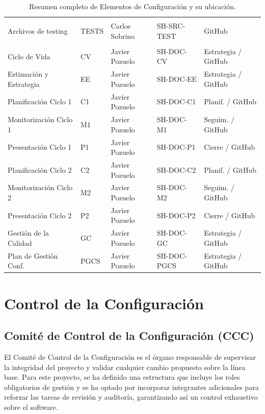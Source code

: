 \documentclass[11pt,a4paper]{article}
\begin{document}
\begin{table}[H]
\begin{tabularx}{\textwidth}{@{}l l l l L@{}}
\midrule
{}  \\
Archivos de testing & TESTS & Carlos Sobrino & SH-SRC-TEST & GitHub \\
\midrule
{}  \\
Ciclo de Vida & CV & Javier Pozuelo & SH-DOC-CV & Estrategia / GitHub \\
Estimación y Estrategia & EE & Javier Pozuelo & SH-DOC-EE & Estrategia / GitHub \\
Planificación Ciclo 1 & C1 & Javier Pozuelo & SH-DOC-C1 & Planif. / GitHub \\
Monitorización Ciclo 1 & M1 & Javier Pozuelo & SH-DOC-M1 & Seguim. / GitHub \\
Presentación Ciclo 1 & P1 & Javier Pozuelo & SH-DOC-P1 & Cierre / GitHub \\
Planificación Ciclo 2 & C2 & Javier Pozuelo & SH-DOC-C2 & Planif. / GitHub \\
Monitorización Ciclo 2 & M2 & Javier Pozuelo & SH-DOC-M2 & Seguim. / GitHub \\
Presentación Ciclo 2 & P2 & Javier Pozuelo & SH-DOC-P2 & Cierre / GitHub \\
Gestión de la Calidad & GC & Javier Pozuelo & SH-DOC-GC & Estrategia / GitHub \\
Plan de Gestión Conf. & PGCS & Javier Pozuelo & SH-DOC-PGCS & Estrategia / GitHub \\
\bottomrule
\end{tabularx}
\caption{Resumen completo de Elementos de Configuración y su ubicación.}
\end{table}

\section{Control de la Configuración}

\subsection{Comité de Control de la Configuración (CCC)}

El Comité de Control de la Configuración es el órgano responsable de supervisar la integridad del proyecto y validar cualquier cambio propuesto sobre la línea base. Para este proyecto, se ha definido una estructura que incluye los roles obligatorios de gestión y se ha optado por incorporar integrantes adicionales para reforzar las tareas de revisión y auditoría, garantizando así un control exhaustivo sobre el software.
\end{document}

